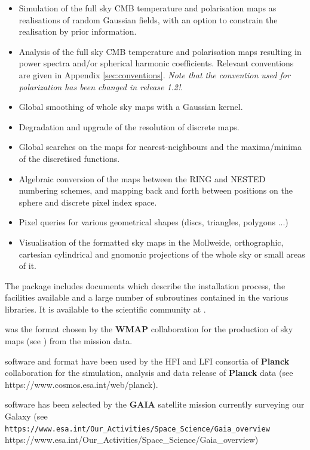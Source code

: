 \documentclass[12pt,twoside]{article}
\begin{document}
\begin{itemize}
\item Simulation of the full sky CMB temperature and polarisation maps
as realisations of random Gaussian fields, with an option to constrain
the realisation by prior information.
\item Analysis of the full sky CMB temperature and polarisation maps
resulting in power spectra and/or spherical harmonic
coefficients. Relevant conventions are given in Appendix \ref{sec:conventions}.
{\large {\em Note that the convention used for polarization has been changed in
release 1.2!}}.
\item Global smoothing of whole sky maps with a Gaussian kernel.
\item Degradation and upgrade of the resolution of discrete maps.
\item Global searches on the maps for nearest-neighbours and 
the maxima/minima of the discretised functions.
\item Algebraic conversion of the maps between the RING and NESTED numbering
schemes, and mapping back and forth between  positions on the sphere and 
discrete pixel index space.
\item Pixel queries for various geometrical shapes (discs, triangles, polygons ...)
\item Visualisation of the \healpix formatted sky maps in the
Mollweide, orthographic, cartesian cylindrical and gnomonic
projections of the whole sky or small areas of it. 
\end{itemize}

The package includes documents which describe the installation
process, the facilities available and a large number of 
subroutines contained in the various libraries. It is
available to the scientific community  at \htmladdnormallink{\texttt{\healpixwebpage}}
{\healpixwebpage}.

\healpix was the format chosen by the \textbf{WMAP}
collaboration 
for the production
of sky maps (see 
)
 from the mission data. 

\healpix software and format have been used by the HFI and LFI consortia of \textbf{Planck}
collaboration for the simulation, analysis and data release of \textbf{Planck} data
(see %
{https://www.cosmos.esa.int/web/planck}).

\healpix software has been selected by the \textbf{GAIA} satellite mission currently surveying our Galaxy
(see 
\htmladdnormallink%
{\texttt{https://www.esa.int/Our\_\-Activities/Space\_\-Science/Gaia\_\-overview}}%
{https://www.esa.int/Our_Activities/Space_Science/Gaia_overview})
\end{document}
